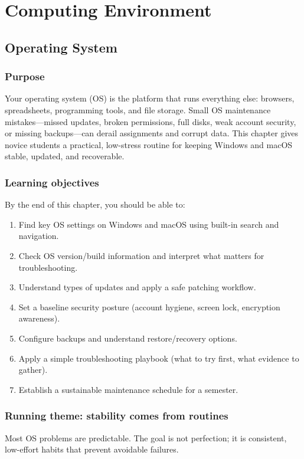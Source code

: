 \part{Computing Environment}
\chapter{Operating System}
\label{ch:os-management}

\section*{Purpose}
Your operating system (OS) is the platform that runs everything else: browsers, spreadsheets, programming tools, and file storage. Small OS maintenance mistakes—missed updates, broken permissions, full disks, weak account security, or missing backups—can derail assignments and corrupt data. This chapter gives novice students a practical, low-stress routine for keeping Windows and macOS stable, updated, and recoverable.

\section*{Learning objectives}
By the end of this chapter, you should be able to:
\begin{enumerate}
\item Find key OS settings on Windows and macOS using built-in search and navigation.
\item Check OS version/build information and interpret what matters for troubleshooting.
\item Understand types of updates and apply a safe patching workflow.
\item Set a baseline security posture (account hygiene, screen lock, encryption awareness).
\item Configure backups and understand restore/recovery options.
\item Apply a simple troubleshooting playbook (what to try first, what evidence to gather).
\item Establish a sustainable maintenance schedule for a semester.
\end{enumerate}

\section*{Running theme: stability comes from routines}
Most OS problems are predictable. The goal is not perfection; it is consistent, low-effort habits that prevent avoidable failures.

